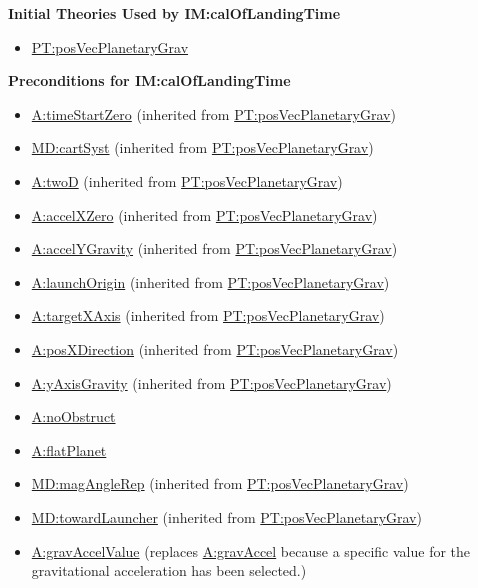 \documentclass[12pt]{article}
\begin{document}
\noindent \textbf{Initial Theories Used by IM:calOfLandingTime}

\begin{itemize}
\item \hyperref[PT:posVecPlanetaryGrav]{PT:posVecPlanetaryGrav}
\end{itemize}

\noindent \textbf{Preconditions for IM:calOfLandingTime}
\begin{itemize}
\item \hyperref[timeStartZero]{A:timeStartZero} (inherited from \hyperref[PT:posVecPlanetaryGrav]{PT:posVecPlanetaryGrav})
\item \hyperref[MD:cartSyst]{MD:cartSyst} (inherited from \hyperref[PT:posVecPlanetaryGrav]{PT:posVecPlanetaryGrav})
\item \hyperref[twoD]{A:twoD} (inherited from \hyperref[PT:posVecPlanetaryGrav]{PT:posVecPlanetaryGrav})
\item \hyperref[accelXZero]{A:accelXZero} (inherited from \hyperref[PT:posVecPlanetaryGrav]{PT:posVecPlanetaryGrav})
\item \hyperref[accelYGravity]{A:accelYGravity} (inherited from \hyperref[PT:posVecPlanetaryGrav]{PT:posVecPlanetaryGrav})
\item \hyperref[launchOrigin]{A:launchOrigin} (inherited from \hyperref[PT:posVecPlanetaryGrav]{PT:posVecPlanetaryGrav})
\item \hyperref[targetXAxis]{A:targetXAxis} (inherited from \hyperref[PT:posVecPlanetaryGrav]{PT:posVecPlanetaryGrav})
\item \hyperref[posXDirection]{A:posXDirection} (inherited from \hyperref[PT:posVecPlanetaryGrav]{PT:posVecPlanetaryGrav})
\item \hyperref[yAxisGravity]{A:yAxisGravity} (inherited from \hyperref[PT:posVecPlanetaryGrav]{PT:posVecPlanetaryGrav})
\item \hyperref[noObstruct]{A:noObstruct}
\item \hyperref[flatPlanet]{A:flatPlanet}
\item \hyperref[MD:magAngleRep]{MD:magAngleRep} (inherited from \hyperref[PT:posVecPlanetaryGrav]{PT:posVecPlanetaryGrav})
\item \hyperref[MD:towardLauncher]{MD:towardLauncher} (inherited from \hyperref[PT:posVecPlanetaryGrav]{PT:posVecPlanetaryGrav})

\item \hyperref[gravAccelValue]{A:gravAccelValue} (replaces
\hyperref[gravAccel]{A:gravAccel} because a specific value for the gravitational
acceleration has been selected.)

\end{itemize}
\end{document}
